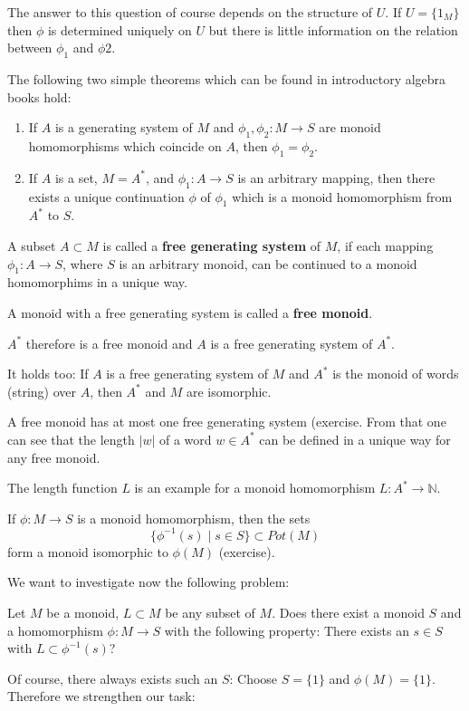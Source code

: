 The answer to this question of course depends on the structure of $U$. If
$U = \{ 1_M \}$ then $\phi$ is determined uniquely on $U$ but there is
little information on the relation between $\phi_1$ and $\phi2$.

The following two simple theorems which can be found in introductory algebra
books hold:
\begin{enumerate}
  \item If $A$ is a generating system of $M$ and $\phi_1, \phi_2 : M \to S$ are
  monoid homomorphisms which coincide on $A$, then $\phi_1 = \phi_2$.
  \item If $A$ is a set, $M = A^*$, and $\phi_1 : A \to S$ is an arbitrary
  mapping, then there exists a unique continuation $\phi$ of $\phi_1$ which is
  a monoid homomorphism from $A^*$ to $S$.
\end{enumerate}

\begin{definition}
A subset $A \subset M$ is called a {\bf free generating system} of $M$, if each
mapping $\phi_1 : A \to S$, where $S$ is an arbitrary monoid, can be continued
to a monoid homomorphims in a unique way. 

A monoid with a free generating system is called a {\bf free monoid}.
\end{definition}

$A^*$ therefore is a free monoid and $A$ is a free generating system of $A^*$.

It holds too: If $A$ is a free generating system of $M$ and $A^*$ is the monoid
of words (string) over $A$, then $A^*$ and $M$ are isomorphic.

A free monoid has at most one free generating system (exercise. From that one
can see that the length $|w|$ of a word $w \in A^*$ can be defined in a unique way for any
free monoid.

The length function $L$ is an example for a monoid homomorphism $L : A^* \to
\mathbb{N}$.

If $\phi : M \to S$ is a monoid homomorphism, then the sets 
\[\{ \phi^{-1}(s) \mid s \in S \} \subset Pot(M) \]
form a monoid isomorphic to $\phi(M)$ (exercise).

We want to investigate now the following problem:

Let $M$ be a monoid, $L \subset M$ be any subset of $M$. Does there exist a
monoid $S$ and a homomorphism $\phi : M \to S$ with the following property:
There exists an $s \in S$ with $L \subset \phi^{-1}(s)$?

Of course, there always exists such an $S$: Choose $S = \{ 1 \}$ and $\phi(M) =
\{1\}$. Therefore we strengthen our task: 

